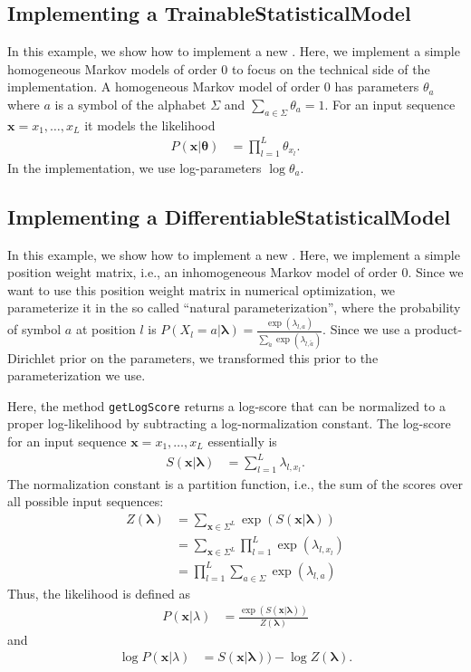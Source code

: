 \subsection{Implementing a TrainableStatisticalModel}
In this example, we show how to implement a new \TrainSM. Here, we implement a simple homogeneous Markov models of order $0$ to focus on the technical side of the implementation. A homogeneous Markov model of order $0$ has parameters $\theta_a$ where $a$ is a symbol of the alphabet $\Sigma$ and $\sum_{a \in \Sigma} \theta_a = 1$. For an input sequence $\mathbf{x} = x_1,\ldots,x_L$ it models the likelihood
\begin{align*}
P(\mathbf{x}|\boldsymbol{\theta}) &= \prod_{l=1}^{L} \theta_{x_l}.
\end{align*}
In the implementation, we use log-parameters $\log \theta_a$.
\renewcommand{\codefile}{recipes/HomogeneousMarkovModel.java}
\setcounter{off}{35}

\subsection{Implementing a DifferentiableStatisticalModel}
In this example, we show how to implement a new \DiffSM. Here, we implement a simple position weight matrix, i.e., an inhomogeneous Markov model of order $0$. Since we want to use this position weight matrix in numerical optimization, we parameterize it in the so called ``natural parameterization'', where the probability of symbol $a$ at position $l$ is $P(X_l=a | \boldsymbol{\lambda}) = \frac{\exp(\lambda_{l,a})}{ \sum_{\tilde{a}} \exp(\lambda_{l,\tilde{a}}) }$. Since we use a product-Dirichlet prior on the parameters, we transformed this prior to the parameterization we use.

Here, the method \lstinline+getLogScore+ returns a log-score that can be normalized to a proper log-likelihood by subtracting a log-normalization constant.
The log-score for an input sequence $\mathbf{x} = x_1,\ldots,x_L$ essentially is
\begin{align*}
S(\mathbf{x}|\boldsymbol{\lambda}) &= \sum_{l=1}^{L} \lambda_{l,x_l}.
\end{align*}
The normalization constant is a partition function, i.e., the sum of the scores over all possible input sequences:
\begin{align*}
Z(\boldsymbol{\lambda}) &= \sum_{\mathbf{x} \in \Sigma^L} \exp( S(\mathbf{x}|\boldsymbol{\lambda}) )\\
&= \sum_{\mathbf{x} \in \Sigma^L} \prod_{l=1}^{L} \exp(\lambda_{l,x_l})\\
&= \prod_{l=1}^{L} \sum_{a \in \Sigma} \exp(\lambda_{l,a})
\end{align*}
Thus, the likelihood is defined as
\begin{align*}
P(\mathbf{x}|\lambda) &= \frac{\exp(S(\mathbf{x}|\boldsymbol{\lambda}))}{Z(\boldsymbol{\lambda})}
\end{align*}
and
\begin{align*}
\log P(\mathbf{x}|\lambda) &= S(\mathbf{x}|\boldsymbol{\lambda})) - \log Z(\boldsymbol{\lambda}).
\end{align*}
\renewcommand{\codefile}{recipes/PositionWeightMatrixDiffSM.java}
\setcounter{off}{34}
